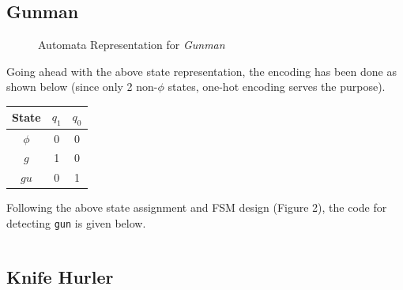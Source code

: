 \documentclass[a4paper, 11pt]{article}
\begin{document}
\inputminted[linenos]{vhdl}{"String Detector/bomb_detector.vhd"}

\subsection{Gunman}

\begin{figure}[H]
\centering

\caption{Automata Representation for \emph{Gunman}}
\end{figure}
Going ahead with the above state representation, the encoding has been done as shown below (since only 2 non-$\phi$ states, one-hot encoding serves the purpose).
\begin{center}
\begin{tabular}{| c | c | c |}
\hline
\bf State & \bf $q_1$ & \bf $q_0$\\
\hline
$\phi$ & 0 & 0 \\
$g$ & 1 & 0 \\
$gu$ &0 & 1 \\
\hline
\end{tabular}
\end{center}
Following the above state assignment and FSM design (Figure 2), the code for detecting \texttt{gun} is given below.
\inputminted[linenos]{vhdl}{"String Detector/gun_detector.vhd"}

\subsection{Knife Hurler}
\end{document}
